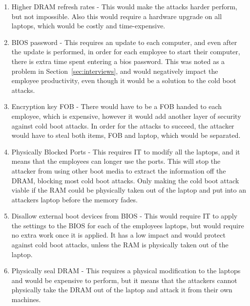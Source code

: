 \documentclass{article}
\numberwithin{equation}{section} %
\numberwithin{figure}{section} %
\numberwithin{table}{section} %
\begin{document}
	\begin{enumerate}
		\item Higher DRAM refresh rates  - This would make the attacks harder perform, but not impossible.  Also this would require a hardware upgrade on all laptops, which would be costly and time-expensive.
		\item BIOS password - This requires an update to each computer, and even after the update is performed, in order for each employee to start their computer, there is extra time spent entering a bios password.  This was noted as a problem in Section~\ref{sec:interviews}, and would negatively impact the employee productivity, even though it would be a solution to the cold boot attacks.
		\item Encryption key FOB - There would have to be a FOB handed to each employee, which is expensive, however it would add another layer of security against cold boot attacks.  In order for the attacks to succeed, the attacker would have to steal both items, FOB and laptop, which would be separated. 
		\item Physically Blocked Ports -  This requires IT to modify all the laptops, and it means that the employees can longer use the ports.  This will stop the attacker from using other boot media to extract the information off the DRAM, blocking most cold boot attacks.  Only making the cold boot attack viable if the RAM could be physically taken out of the laptop and put into an attackers laptop before the memory fades. 
		\item Disallow external boot devices from BIOS - This would require IT to apply the settings to the BIOS for each of the employees laptops, but would require no extra work once it is applied.  It has a low impact and would protect against cold boot attacks, unless the RAM is physically taken out of the laptop.
		\item Physically seal DRAM - This requires a physical modification to the laptops and would be expensive to perform, but it means that the attackers cannot physically take the DRAM out of the laptop and attack it from their own machines.
	\end{enumerate}
		
\end{document}
